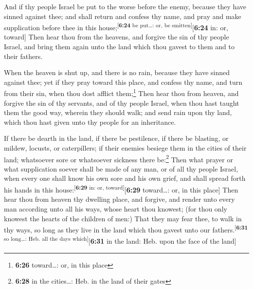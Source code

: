  And if thy people Israel be put to the worse before the
enemy, because they have sinned against thee; and shall return and
confess thy name, and pray and make supplication before thee in this
house;\textsuperscript{{[}\textbf{6:24} be put\ldots: or, be
smitten{]}}{[}\textbf{6:24} in: or, toward{]}  Then hear
thou from the heavens, and forgive the sin of thy people Israel, and
bring them again unto the land which thou gavest to them and to their
fathers.

 When the heaven is shut up, and there is no rain,
because they have sinned against thee; yet if they pray toward this
place, and confess thy name, and turn from their sin, when thou dost
afflict them;\footnote{\textbf{6:26} toward\ldots: or, in this place}
 Then hear thou from heaven, and forgive the sin of thy
servants, and of thy people Israel, when thou hast taught them the good
way, wherein they should walk; and send rain upon thy land, which thou
hast given unto thy people for an inheritance.

 If there be dearth in the land, if there be pestilence,
if there be blasting, or mildew, locusts, or caterpillers; if their
enemies besiege them in the cities of their land; whatsoever sore or
whatsoever sickness there be:\footnote{\textbf{6:28} in the
  cities\ldots: Heb. in the land of their gates}  Then
what prayer or what supplication soever shall be made of any man, or of
all thy people Israel, when every one shall know his own sore and his
own grief, and shall spread forth his hands in this
house:\textsuperscript{{[}\textbf{6:29} in: or,
toward{]}}{[}\textbf{6:29} toward\ldots: or, in this place{]}
 Then hear thou from heaven thy dwelling place, and
forgive, and render unto every man according unto all his ways, whose
heart thou knowest; (for thou only knowest the hearts of the children of
men:)  That they may fear thee, to walk in thy ways, so
long as they live in the land which thou gavest unto our
fathers.\textsuperscript{{[}\textbf{6:31} so long\ldots: Heb. all the
days which{]}}{[}\textbf{6:31} in the land: Heb. upon the face of the
land{]}

